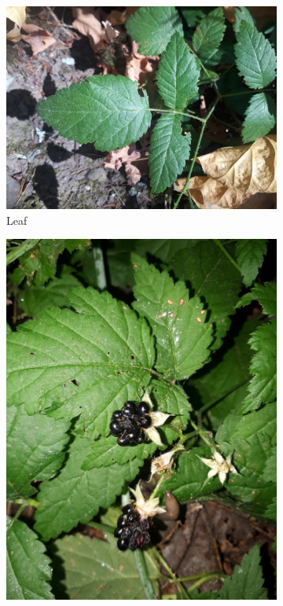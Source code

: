 \begin{figure}
\centering
\begin{subfigure}{0.47\textwidth}
    \includegraphics[width=\textwidth]{rubus/ursinus_leaf_01}
    \caption{Leaf}
    \label{fig:rub:ursinus:leaf}
\end{subfigure}
\hfill
\begin{subfigure}{0.47\textwidth}
    \includegraphics[width=\textwidth]{rubus/ursinus_berry_02}

\end{subfigure}
\end{figure}
